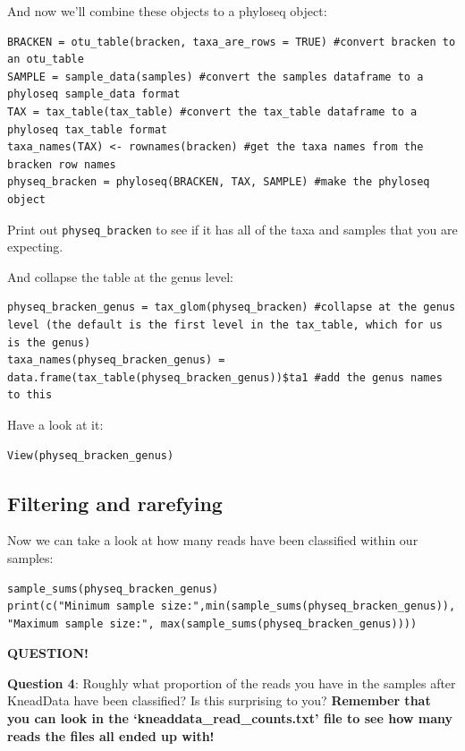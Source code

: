 \documentclass[
]{book}
\newenvironment{bluebox}{
  \definecolor{shadecolor}{RGB}{172, 210, 237}
  \color{white}
  \begin{shaded}}
 {\end{shaded}}
\begin{document}
And now we'll combine these objects to a phyloseq object:

\begin{verbatim}
BRACKEN = otu_table(bracken, taxa_are_rows = TRUE) #convert bracken to an otu_table
SAMPLE = sample_data(samples) #convert the samples dataframe to a phyloseq sample_data format
TAX = tax_table(tax_table) #convert the tax_table dataframe to a phyloseq tax_table format
taxa_names(TAX) <- rownames(bracken) #get the taxa names from the bracken row names
physeq_bracken = phyloseq(BRACKEN, TAX, SAMPLE) #make the phyloseq object
\end{verbatim}

Print out \texttt{physeq\_bracken} to see if it has all of the taxa and samples that you are expecting.

And collapse the table at the genus level:

\begin{verbatim}
physeq_bracken_genus = tax_glom(physeq_bracken) #collapse at the genus level (the default is the first level in the tax_table, which for us is the genus)
taxa_names(physeq_bracken_genus) = data.frame(tax_table(physeq_bracken_genus))$ta1 #add the genus names to this
\end{verbatim}

Have a look at it:

\begin{verbatim}
View(physeq_bracken_genus)
\end{verbatim}

\subsection{Filtering and rarefying}\label{filtering-and-rarefying}

Now we can take a look at how many reads have been classified within our samples:

\begin{verbatim}
sample_sums(physeq_bracken_genus)
print(c("Minimum sample size:",min(sample_sums(physeq_bracken_genus)), "Maximum sample size:", max(sample_sums(physeq_bracken_genus))))
\end{verbatim}

\begin{bluebox}

\begin{center}
\textbf{QUESTION!}

\end{center}

\textbf{Question 4}: Roughly what proportion of the reads you have in the samples after KneadData have been classified? Is this surprising to you?
\textbf{Remember that you can look in the `kneaddata\_read\_counts.txt' file to see how many reads the files all ended up with!}

\end{bluebox}
\end{document}
